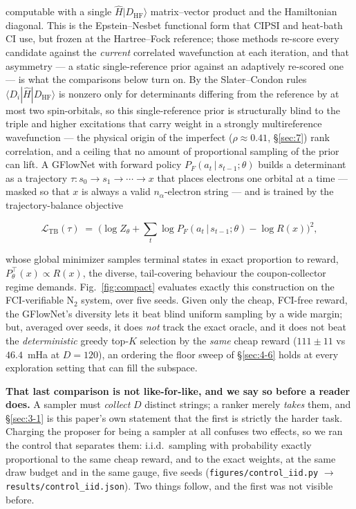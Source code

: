 \documentclass[onecolumn,a4paper]{quantumarticle}
\begin{document}
computable with a single $\hat H|D_{\mathrm{HF}}\rangle$ matrix--vector product and the Hamiltonian diagonal. This is the Epstein--Nesbet functional form that CIPSI and heat-bath CI use, but frozen at the Hartree--Fock reference; those methods re-score every candidate against the \emph{current} correlated wavefunction at each iteration, and that asymmetry --- a static single-reference prior against an adaptively re-scored one --- is what the comparisons below turn on. By the Slater--Condon rules $\langle D_i|\hat H|D_{\mathrm{HF}}\rangle$ is nonzero only for determinants differing from the reference by at most two spin-orbitals, so this single-reference prior is structurally blind to the triple and higher excitations that carry weight in a strongly multireference wavefunction --- the physical origin of the imperfect ($\rho{\approx}0.41$, \S\ref{sec:7}) rank correlation, and a ceiling that no amount of proportional sampling of the prior can lift. A GFlowNet with forward policy $P_F(a_t\,|\,s_{t-1};\theta)$ builds a determinant as a trajectory $\tau: s_0\to s_1\to\cdots\to x$ that places electrons one orbital at a time --- masked so that $x$ is always a valid $n_\alpha$-electron string --- and is trained by the trajectory-balance objective

\begin{equation}
\mathcal L_{\mathrm{TB}}(\tau) \;=\; \Big(\log Z_\theta + \sum_{t}\log P_F(a_t\,|\,s_{t-1};\theta) - \log R(x)\Big)^{2},
\end{equation}

whose global minimizer samples terminal states in exact proportion to reward, $P^{\top}_\theta(x)\propto R(x)$, the diverse, tail-covering behaviour the coupon-collector regime demands. Fig.~\ref{fig:compact} evaluates exactly this construction on the FCI-verifiable N$_2$ system, over five seeds. Given only the cheap, FCI-free reward, the GFlowNet's diversity lets it beat blind uniform sampling by a wide margin; but, averaged over seeds, it does \emph{not} track the exact oracle, and it does not beat the \emph{deterministic} greedy top-$K$ selection by the \emph{same} cheap reward ($111\pm11$ vs $46.4$~mHa at $D{=}120$), an ordering the floor sweep of \S\ref{sec:4-6} holds at every exploration setting that can fill the subspace.

\textbf{That last comparison is not like-for-like, and we say so before a reader does.} A sampler must \emph{collect} $D$ distinct strings; a ranker merely \emph{takes} them, and \S\ref{sec:3-1} is this paper's own statement that the first is strictly the harder task. Charging the proposer for being a sampler at all confuses two effects, so we ran the control that separates them: i.i.d.\ sampling with probability exactly proportional to the same cheap reward, and to the exact weights, at the same draw budget and in the same gauge, five seeds (\texttt{figures/control\_iid.py} $\to$ \texttt{results/control\_iid.json}). Two things follow, and the first was not visible before.
\end{document}
